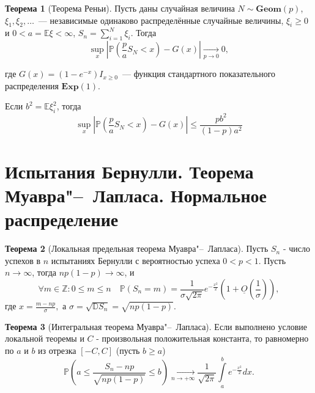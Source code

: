 \documentclass[oneside,final,14pt]{extreport}
\theoremstyle{plain}
\theoremstyle{definition}
\theoremstyle{named}
\newtheorem*{namedthm}{Теорема}
\begin{document}
\begin{namedthm}[Теорема Реньи]
Пусть даны случайная величина $N \sim \mathbf{Geom}(p)$, $\xi_1, \xi_2, \ldots$~--- независимые одинаково распределённые случайные величины, $\xi_i \geqslant 0$ и $0 < a = \mathbb{E}\xi < \infty$, $S_n = \sum\limits_{i=1}^N \xi_i$. Тогда
\begin{equation*}
    \sup\limits_{x}\left|\mathbb{P}\left(\frac{p}{a} S_{N}<x\right)-G(x)\right| \underset{p \rightarrow 0}{\longrightarrow} 0,
\end{equation*}

где $G(x)=\left(1-e^{-x}\right) I_{x \geqslant 0}$~--- функция стандартного показательного распределения $\mathbf{Exp}(1)$.

Если $b^2 = \mathbb{E}\xi_i^2$, тогда
\begin{equation*}
    \sup\limits_{x}\left|\mathbb{P}\left(\frac{p}{a} S_{N}<x\right)-G(x)\right| \leqslant \frac{p b^{2}}{(1-p) a^{2}}
\end{equation*}
\end{namedthm}

\section{Испытания Бернулли. Теорема Муавра"--~Лапласа. Нормальное распределение}

\begin{namedthm} [Локальная предельная теорема Муавра"--~Лапласа]
    Пусть $S_n$ - число успехов в $n$ испытаниях Бернулли с вероятностью успеха $0 < p < 1$. Пусть $n \to \infty$, тогда $n p(1-p) {\longrightarrow} \infty$, и 
$$\forall m \in \mathbb{Z}: 0 \leqslant m \leqslant n \quad \mathbb{P}\left(S_{n}=m\right)=\frac{1}{\sigma \sqrt{2 \pi} } e^{-\frac{x^{2}}{2}}\left(1+\underline{O}\left(\frac{1}{\sigma}\right)\right),$$
где $x = \frac{m - np}{\sigma},$ а $\sigma=\sqrt{\mathbb{D} S_{n}}=\sqrt{n p(1-p)}$.
\end{namedthm}  

\begin{namedthm}[Интегральная теорема Муавра"--~Лапласа]
Если выполнено условие локальной теоремы и $C$ - произвольная положительная константа, то равномерно по $a$ и $b$ из отрезка $[-C,C]$ (пусть $b \geqslant a$)
$$\mathbb{P}\left(a \leqslant \frac{S_{n}-n p}{\sqrt{n p(1-p)}} \leqslant b\right) \underset{n \to +\infty}{\longrightarrow} \frac{1}{\sqrt{2 \pi}} \int\limits_{a}^{b} e^{-\frac{x^{2}}{2}} d x.$$
\end{namedthm} 
\end{document}
